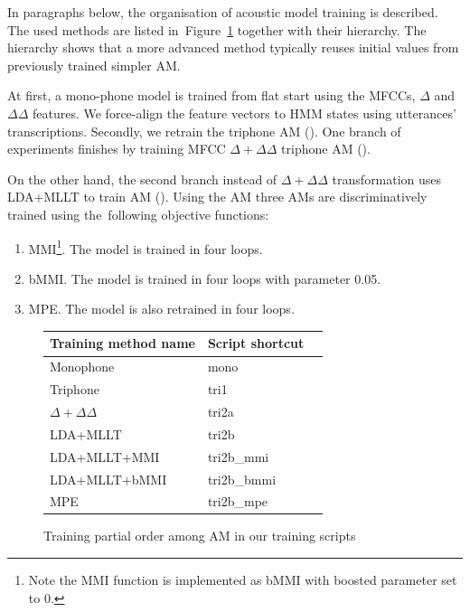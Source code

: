 In paragraphs below, the organisation of acoustic model training is described. 
The used methods are listed in~Figure~\ref{fig:am-deps} together with their hierarchy.
The hierarchy shows that a more advanced method typically reuses initial values from previously trained simpler \ac{AM}.

At first, a mono-phone model is trained from flat start using the MFCCs, $\Delta$ and $\Delta \Delta$ features.
We force-align the feature vectors to HMM states using utterances' transcriptions.
Secondly, we retrain the triphone \ac{AM} ().
One branch of experiments finishes by training \ac{MFCC} $\Delta + \Delta\Delta$ triphone \ac{AM} (). %

On the other hand, the second branch instead of $\Delta + \Delta\Delta$ transformation uses \ac{LDA}+\ac{MLLT} to train \ac{AM} ().
Using the \ac{AM}  three \acp{AM} are discriminatively trained using the~following objective functions:
\begin{enumerate}
    \item \acl{MMI}\cite{chow1990maximum}\footnote{Note the \ac{MMI} function is implemented as \acs{bMMI} with boosted parameter set to 0.}. The model is trained in four loops.
    \item \acl{bMMI}\cite{povey2008boosted}. The model  is trained in four loops with parameter 0.05.
    \item \acl{MPE}\cite{povey2003mmi}. The model  is also retrained in four loops.
\end{enumerate}

\begin{figure}[!htp]
    \begin{center}
    
    \small{\begin{tabular}{lll}
    \hline
    Training method name & Script shortcut \\
    \hline
    Monophone & mono \\
    Triphone  & tri1 \\
    $\Delta + \Delta\Delta$ & tri2a  \\
    \acs{LDA}+\acs{MLLT} & tri2b  \\
    \acs{LDA}+\acs{MLLT}+\acs{MMI} & tri2b\_mmi \\
    \acs{LDA}+\acs{MLLT}+\acs{bMMI} & tri2b\_bmmi \\
    \acs{MPE} & tri2b\_mpe \\
    \hline
    \end{tabular}}
    \end{center}
    \caption{Training partial order among \ac{AM} in our training scripts}
    \label{fig:am-deps} 
\end{figure}

